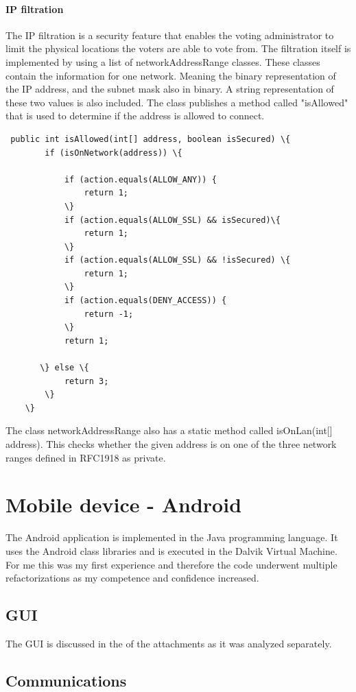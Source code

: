 \documentclass[11pt,twoside,a4paper]{book}
\begin{document}
\paragraph{IP filtration}
The IP filtration is a security feature that enables the voting administrator to limit the physical locations the voters are able to vote from. The filtration itself is implemented by using a list of networkAddressRange classes. These classes contain the information for one network. Meaning the binary representation of the IP address, and the subnet mask also in binary. A string representation of these two values is also included. The class publishes a method called "isAllowed" that is used to determine if the address is allowed to connect.

\begin{lstlisting}
 public int isAllowed(int[] address, boolean isSecured) \{
        if (isOnNetwork(address)) \{

            if (action.equals(ALLOW_ANY)) {
                return 1;
            \}
            if (action.equals(ALLOW_SSL) && isSecured)\{
                return 1;
            \}
            if (action.equals(ALLOW_SSL) && !isSecured) \{
                return 1;
            \}
            if (action.equals(DENY_ACCESS)) {
                return -1;
            \}
            return 1;

       \} else \{
            return 3;
        \}
    \}
\end{lstlisting}
The class networkAddressRange also has a static method called isOnLan(int[] address). This checks whether the given address is on one of the three network ranges defined in RFC1918 as private.

\section{Mobile device - Android}
The Android application is implemented in the Java programming language. It uses the Android class libraries and is executed in the Dalvik Virtual Machine. For me this was my first experience and therefore the code underwent multiple refactorizations as my competence and confidence increased.
\subsection{GUI} 
The GUI is discussed in the of the attachments as it was analyzed separately.
\subsection{Communications}
\end{document}

